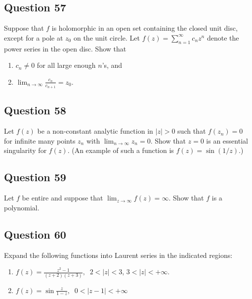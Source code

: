 \documentclass[12pt]{article}
\begin{document}
\hypertarget{question-57-2}{%
\subsection{Question 57}\label{question-57-2}}

Suppose that \(f\) is holomorphic in an open set containing the closed
unit disc, except for a pole at \(z_0\) on the unit circle. Let
\(f(z) = \sum_{n = 1}^\infty c_n z^n\) denote the power series in the
open disc. Show that

\begin{enumerate}
\def\labelenumi{(\arabic{enumi})}
\item
  \(c_n \neq 0\) for all large enough \(n\)'s, and
\item
  \(\displaystyle \lim_{n \rightarrow \infty} \frac{c_n}{c_{n+1}}= z_0\).
\end{enumerate}

\hypertarget{question-58-2}{%
\subsection{Question 58}\label{question-58-2}}

Let \(f(z)\) be a non-constant analytic function in \(|z|>0\) such that
\(f(z_n) = 0\) for infinite many points \(z_n\) with
\(\lim_{n \rightarrow \infty} z_n =0\). Show that \(z=0\) is an
essential singularity for \(f(z)\). (An example of such a function is
\(f(z) = \sin (1/z)\).)

\hypertarget{question-59-2}{%
\subsection{Question 59}\label{question-59-2}}

Let \(f\) be entire and suppose that
\(\lim_{z \rightarrow \infty} f(z) = \infty\). Show that \(f\) is a
polynomial.

\hypertarget{question-60-2}{%
\subsection{Question 60}\label{question-60-2}}

Expand the following functions into Laurent series in the indicated
regions:

\begin{enumerate}
\def\labelenumi{(\alph{enumi})}
\item
  \(\displaystyle f(z) = \frac{z^2 - 1}{ (z+2)(z+3)}, \; \; 2 < |z| < 3\),
  \(3 < |z| < + \infty\).
\item
  \(\displaystyle f(z) = \sin \frac{z}{1-z}, \; \; 0 < |z-1| < + \infty\)
\end{enumerate}
\end{document}
